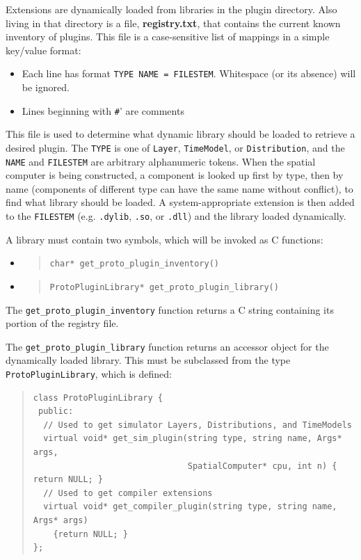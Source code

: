 \documentclass{article}
\newcommand\code[1]{\begin{quote}\var{#1}\end{quote}}
\newcommand\var[1]{{\tt #1}}
\begin{document}
Extensions are dynamically loaded from libraries in the plugin
directory.  Also living in that directory is a file, {\bf
  registry.txt}, that contains the current known inventory of plugins.
This file is a case-sensitive list of mappings in a simple key/value format:
\begin{itemize}
\item Each line has format {\tt TYPE NAME = FILESTEM}.  Whitespace (or its
  absence) will be ignored.
\item Lines beginning with {\tt \#}' are comments
\end{itemize}
This file is used to determine what dynamic library should be loaded
to retrieve a desired plugin.  The \var{TYPE} is one of \var{Layer},
\var{TimeModel}, or \var{Distribution}, and the
\var{NAME} and \var{FILESTEM} are arbitrary alphanumeric tokens.  When
the spatial computer is being constructed, a component is looked up
first by type, then by name (components of different type can have the
same name without conflict), to find what library should be loaded.  A
system-appropriate extension is then added to the \var{FILESTEM}
(e.g. \var{.dylib}, \var{.so}, or \var{.dll}) and the library loaded
dynamically.

A library must contain two symbols, which will be invoked as C functions:
\begin{itemize}
\item \code{char* get\_proto\_plugin\_inventory()}
\item \code{ProtoPluginLibrary* get\_proto\_plugin\_library()}
\end{itemize}

The \var{get\_proto\_plugin\_inventory} function returns a C string
containing its portion of the registry file.

The \var{get\_proto\_plugin\_library} function returns an accessor
object for the dynamically loaded library.  This must be subclassed
from the type \var{ProtoPluginLibrary}, which is defined:
\begin{quote}
\begin{verbatim}
class ProtoPluginLibrary {
 public:
  // Used to get simulator Layers, Distributions, and TimeModels
  virtual void* get_sim_plugin(string type, string name, Args* args, 
                               SpatialComputer* cpu, int n) { return NULL; }
  // Used to get compiler extensions
  virtual void* get_compiler_plugin(string type, string name, Args* args) 
    {return NULL; }
};
\end{verbatim}
\end{quote}
\end{document}
